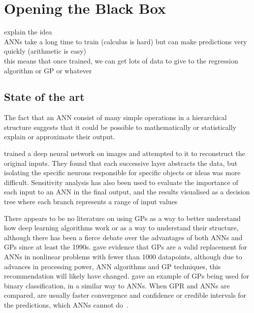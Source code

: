 
\chapter{Opening the Black Box}

\begin{todo}
	explain the idea \\
	ANNs take a long time to train (calculus is hard) but can make predictions very quickly (arithmetic is easy) \\
	this means that once trained, we can get lots of data to give to the regression algorithm or GP or whatever  
\end{todo}

\section{State of the art}

The fact that  an \ac{ANN} consist of many simple operations in a hierarchical structure suggests that it could be possible to mathematically or statistically explain or approximate their output.

\textcite[13]{cortez2013} trained a deep neural network on images and attempted to  it to reconstruct the original inputs.
They found that each successive layer abstracts the data, but isolating the specific neurons responsible for specific objects or ideas was more difficult.
Sensitivity analysis has also been used to evaluate the importance of each input to an \ac{ANN} in the final output, and the results visualised as a decision tree where each branch represents a range of input values~

There appears to be no literature on using \acp{GP} as a way to better understand how deep learning algorithms work or as a way to understand their structure, although there has been a fierce debate over the advantages of both \acp{ANN} and \acp{GP} since at least the 1990s.
\textcite[65--66]{rasmussen1997} gave evidence that \acp{GP} are a valid replacement for \acp{ANN} in nonlinear problems with fewer than 1000 datapoints, although due to advances in processing power, \ac{ANN} algorithms and \ac{GP} techniques, this recommendation will likely have changed.
\textcite[25]{mackay1997} gave an example of \acp{GP} being used for binary classification, in a similar way to \acp{ANN}.
When \ac{GPR} and \acp{ANN} are compared,  are usually faster convergence and confidence or credible intervals for the predictions, which \acp{ANN} cannot do~\autocite{herbrich2003}.

